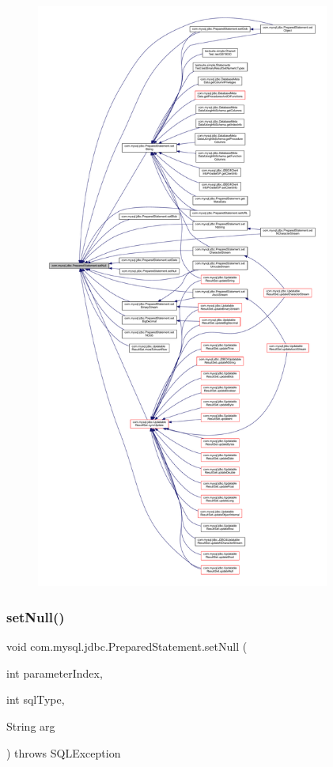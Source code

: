 \begin{figure}[H]
\begin{center}
\leavevmode
\includegraphics[height=550pt]{classcom_1_1mysql_1_1jdbc_1_1_prepared_statement_ab885f67afaf798c888f537898f82809e_icgraph}
\end{center}
\end{figure}
\mbox{\label{classcom_1_1mysql_1_1jdbc_1_1_prepared_statement_a52e34d1cb0264c8eb6f8bac60385e446}} 
\subsubsection{\texorpdfstring{set\+Null()}{setNull()}\hspace{0.1cm}{\footnotesize\ttfamily [2/2]}}
{\footnotesize\ttfamily void com.\+mysql.\+jdbc.\+Prepared\+Statement.\+set\+Null (\begin{DoxyParamCaption}\item[{int}]{parameter\+Index,  }\item[{int}]{sql\+Type,  }\item[{String}]{arg }\end{DoxyParamCaption}) throws S\+Q\+L\+Exception}

